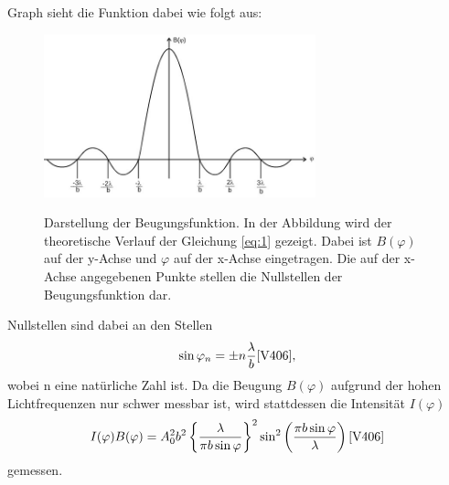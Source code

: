 \justifying Graph sieht die Funktion dabei wie folgt aus:
\begin{figure}[H]
    \centering
    \includegraphics[width=0.7\textwidth]{images/graph.jpg}
    \label{fig:2}
    \caption{Darstellung der Beugungsfunktion\cite{V406}.
    In der Abbildung wird der theoretische Verlauf der Gleichung \eqref{eq:1} gezeigt. 
    Dabei ist $B(\varphi)$ auf der y-Achse und $\varphi$ auf der x-Achse eingetragen.
    Die auf der x-Achse angegebenen Punkte stellen die Nullstellen der Beugungsfunktion dar.
    }
\end{figure}
\justifying Nullstellen sind dabei an den Stellen
\begin{align}
    \sin \varphi _n = \pm n \frac{\lambda}{b} \text{\cite{V406}} \label{eq:3},
\end{align}
wobei n eine natürliche Zahl ist.
Da die Beugung $B(\varphi)$ aufgrund der hohen Lichtfrequenzen nur schwer messbar ist,
wird stattdessen die Intensität $I(\varphi)$ 
\begin{align}
    I(\varphi)  B(\varphi) = A_0^2 b^2 \left\{\frac{\lambda}{\pi b \sin \varphi} \right\}^2 \sin ^2 \left(\frac{\pi b \sin \varphi}{\lambda} \right) \text{\cite{V406}} \label{eq:4}
\end{align}
gemessen.\\



